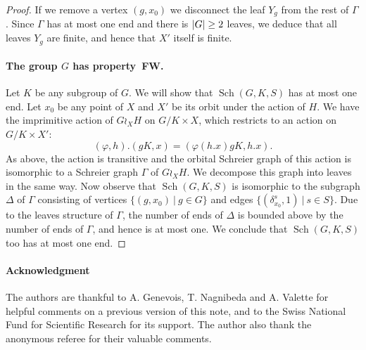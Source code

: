 \documentclass[a4paper]{article}
\theoremstyle{definition}
\theoremstyle{remark}
\DeclareMathOperator\Sch{Sch}
\DeclarePairedDelimiter\abs{\lvert}{\rvert}
\newcommand{\setst}[2]{\{#1\ |\ #2\}}
\begin{document}
\begin{proof}
%
%

If we remove a vertex $(g,x_0)$ we disconnect the leaf $Y_g$ from the rest of $\Gamma$.
Since $\Gamma$ has at most one end and there is $\abs G\geq 2$ leaves, we deduce that all leaves $Y_g$ are finite, and hence that $X'$ itself is finite.
%
%
%
\paragraph{The group $G$ has property~FW.}
Let $K$ be any subgroup of $G$. We will show that $\Sch(G,K,S)$ has at most  one end.
Let $x_0$ be any point of $X$ and $X'$ be its orbit under the action of $H$.
We have the imprimitive action of $G\wr_XH$ on $G/K\times X$, which restricts to an action on $G/K\times X'$:
\[
	(\varphi,h).(gK,x) = (\varphi(h.x) gK, h.x).
\]
As above, the action is transitive and the orbital Schreier graph of this action is isomorphic to a Schreier graph $\Gamma$ of $G\wr_XH$. We decompose this graph into leaves in the same way.
Now observe that $\Sch(G,K,S)$ is isomorphic to the subgraph $\Delta$ of $\Gamma$ consisting of vertices $\setst{(g,x_0)}{g\in G}$ and edges $\setst{(\delta_{x_0}^s,1)}{s\in S}$.
Due to the leaves structure of $\Gamma$, the number of ends of $\Delta$ is bounded above by the number of ends of $\Gamma$, and hence is at most one.
We conclude that $\Sch(G,K,S)$ too has at most one end.
\end{proof}
%
%
\paragraph{Acknowledgment}
The authors are thankful to A. Genevois, T. Nagnibeda and A. Valette for helpful comments on a previous version of this note, and to the Swiss National Fund for Scientific Research for its support.
The author also thank the anonymous referee for their valuable comments.
\end{document}
